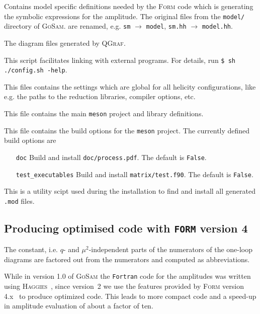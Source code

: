 \documentclass[11pt,a4paper]{refrep}
\newcommand{\gosamversion}{{3{.}0}}
\newcommand{\gosam}{\textsc{GoSam}\xspace}
\newcommand{\gosamv}[1][\gosamversion]{\textsc{GoSam}\xspace}
\newcommand{\qgraf}{\textsc{QGraf}\xspace}
\newcommand{\form}{\textsc{Form}\xspace}
\newcommand{\haggies}{\textsc{Haggies}\xspace}
\begin{document}
Contains model specific definitions needed by the \form code
which is generating the symbolic expressions for the amplitude.
The original files from the \texttt{model/} directory of \gosamv. 
are renamed, e.g.
\texttt{sm} $\to$ \texttt{model}, \texttt{sm.hh} $\to$ \texttt{model.hh}.

 The diagram files generated
by \qgraf.

 This script facilitates linking with external
programs. For details, run
{\tt \$ sh ./config.sh -help}.

 This files contains the settings
which are global for all helicity configurations, 
like e.g. the paths to the reduction libraries, compiler options, etc.

 This file contains the main \texttt{meson} project and library definitions.

 This file contains the build options for the \texttt{meson} project. The currently
defined build options are 
\begin{itemize}
   \item[{\tt doc}] Build and install {\tt doc/process.pdf}. The default is {\tt False}.
   \item[{\tt test\_executables}] Build and install {\tt matrix/test.f90}. The default is {\tt False}. 
\end{itemize}

 This is a utility scipt used during the installation to find and
install all generated {\tt {.}mod} files.

\subsection{Producing optimised code  with {\tt FORM} version 4}

The constant, i.e. $q$- and $\mu^2$-independent parts of the numerators
of the one-loop diagrams are factored out from the numerators and computed
as abbreviations. 

While in version 1.0 of \gosam{} the {\tt Fortran} code for the
amplitudes was written using \haggies~\cite{Reiter:2009ts}, since version~2 we 
use the features provided by \form{} version
4.x~\cite{Kuipers:2012rf} to produce optimized code. This leads to more
compact code and a speed-up in amplitude evaluation of about a factor
of ten.
\end{document}
